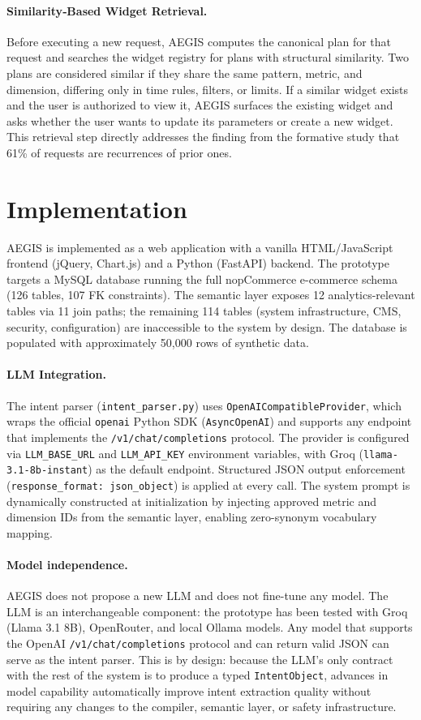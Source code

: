 \documentclass[11pt]{article}
\begin{document}
\paragraph{Similarity‑Based Widget Retrieval.} Before executing a new request, AEGIS computes the canonical plan for that request and searches the widget registry for plans with structural similarity. Two plans are considered similar if they share the same pattern, metric, and dimension, differing only in time rules, filters, or limits. If a similar widget exists and the user is authorized to view it, AEGIS surfaces the existing widget and asks whether the user wants to update its parameters or create a new widget. This retrieval step directly addresses the finding from the formative study that 61\% of requests are recurrences of prior ones.

\section{Implementation}
AEGIS is implemented as a web application with a vanilla HTML/JavaScript frontend (jQuery, Chart.js) and a Python (FastAPI) backend. The prototype targets a MySQL database running the full nopCommerce e-commerce schema (126 tables, 107 FK constraints). The semantic layer exposes 12 analytics-relevant tables via 11 join paths; the remaining 114 tables (system infrastructure, CMS, security, configuration) are inaccessible to the system by design. The database is populated with approximately 50,000 rows of synthetic data.

\paragraph{LLM Integration.} The intent parser (\texttt{intent\_parser.py}) uses \texttt{OpenAICompatibleProvider}, which wraps the official \texttt{openai} Python SDK (\texttt{AsyncOpenAI}) and supports any endpoint that implements the \texttt{/v1/chat/completions} protocol. The provider is configured via \texttt{LLM\_BASE\_URL} and \texttt{LLM\_API\_KEY} environment variables, with Groq (\texttt{llama-3.1-8b-instant}) as the default endpoint. Structured JSON output enforcement (\texttt{response\_format: json\_object}) is applied at every call. The system prompt is dynamically constructed at initialization by injecting approved metric and dimension IDs from the semantic layer, enabling zero-synonym vocabulary mapping.

\paragraph{Model independence.} AEGIS does not propose a new LLM and does not fine-tune any model. The LLM is an interchangeable component: the prototype has been tested with Groq (Llama 3.1 8B), OpenRouter, and local Ollama models. Any model that supports the OpenAI \texttt{/v1/chat/completions} protocol and can return valid JSON can serve as the intent parser. This is by design: because the LLM's only contract with the rest of the system is to produce a typed \texttt{IntentObject}, advances in model capability automatically improve intent extraction quality without requiring any changes to the compiler, semantic layer, or safety infrastructure.
\end{document}
